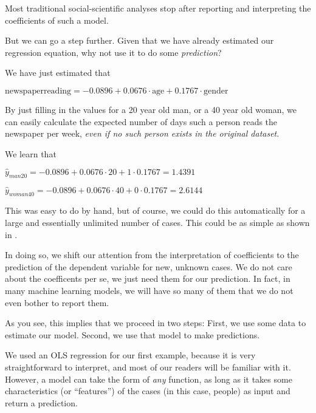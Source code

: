 Most traditional social-scientific analyses stop after reporting and
interpreting the coefficients of such a model.

But we can go a step further. Given that we have already estimated our
regression equation, why not use it to do some \emph{prediction}?

We have just estimated that

$\textrm{newspaperreading} = -0.0896 + 0.0676 \cdot \textrm{age} + 0.1767 \cdot \textrm{gender}$

By just filling in the values for a 20 year old man, or a 40 year old
woman, we can easily calculate the expected number of days such a
person reads the newspaper per week, \emph{even if no such person
  exists in the original dataset}.

We learn that

$\hat{y}_{man20} = -0.0896 + 0.0676 \cdot 20 + 1 \cdot 0.1767 = 1.4391$

$\hat{y}_{woman40} = -0.0896 + 0.0676 \cdot 40 + 0 \cdot 0.1767 = 2.6144$

This was easy to do by hand, but of course, we could do this automatically for a
large and essentially unlimited number of cases.
This could be as simple as shown in .


In doing so, we shift our attention from the interpretation of coefficients to
the prediction of the dependent variable for new, unknown cases. We do not
care about the coefficents per se, we just need them for our prediction.
In fact, in many machine learning models, we will have so many of them that
we do not even bother to report them.

As you see, this implies that we proceed in two steps: First, we use some data
to estimate our model. Second, we use that model to make predictions.

We used an OLS regression for our first example, because it is very
straightforward to interpret, and most of our readers will be familiar
with it.  However, a model can take the form of \emph{any} function,
as long as it takes some characteristics (or ``features'') of the
cases (in this case, people) as input and return a prediction.

